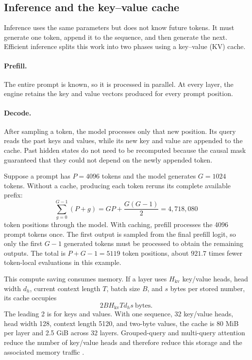 \subsection{Inference and the key--value cache}
\label{sec:transformer-inference}

Inference uses the same parameters but does not know future tokens. It must generate one
token, append it to the sequence, and then generate the next. Efficient inference splits
this work into two phases using a key--value (KV) cache.

\paragraph{Prefill.}
The entire prompt is known, so it is processed in parallel. At every layer, the engine
retains the key and value vectors produced for every prompt position.

\paragraph{Decode.}
After sampling a token, the model processes only that new position. Its query reads the
past keys and values, while its new key and value are appended to the cache. Past hidden
states do not need to be recomputed because the causal mask guaranteed that they could
not depend on the newly appended token.

Suppose a prompt has $P=4096$ tokens and the model generates $G=1024$ tokens. Without a
cache, producing each token reruns its complete available prefix:
\begin{equation}
  \sum_{g=0}^{G-1}(P+g)
  =GP+\frac{G(G-1)}{2}
  =4{,}718{,}080
\end{equation}
token positions through the model. With caching, prefill processes the 4096 prompt tokens
once. The first output is sampled from the final prefill logit, so only the first
$G-1$ generated tokens must be processed to obtain the remaining outputs. The total is
$P+G-1=5119$ token positions, about $921.7$ times fewer token-local evaluations in this
example.

This compute saving consumes memory. If a layer uses $H_{\mathrm{kv}}$ key/value heads,
head width $d_h$, current context length $T$, batch size $B$, and $s$ bytes per stored
number, its cache occupies
\begin{equation}
  2BH_{\mathrm{kv}}Td_hs\ \text{bytes}.
\end{equation}
The leading 2 is for keys and values. With one sequence, 32 key/value heads, head width
128, context length 5120, and two-byte values, the cache is 80 MiB per layer and 2.5 GiB
across 32 layers. Grouped-query and multi-query attention reduce the number of key/value
heads and therefore reduce this storage and the associated memory traffic
\citep{shazeer2019fastdecoding}.

